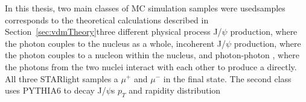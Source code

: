     In this thesis, two main classes of MC simulation samples were used\DIFdelbegin {}\DIFdelend \DIFaddbegin {}\DIFaddend samples corresponds to the theoretical calculations 
      described in Section~\ref{sec:vdmTheory}\DIFdelbegin {}\DIFdelend \DIFaddbegin {}\DIFaddend three different physical process \DIFdelbegin {}\DIFdelend \DIFaddbegin {}\DIFaddend J/$\psi$ production, where the photon couples to the nucleus as
      a whole, incoherent J/$\psi$ production, where the photon couples to a
      nucleon within the nucleus, and \DIFdelbegin {}\DIFdelend photon-photon \DIFdelbegin {}\DIFdelend \DIFaddbegin {}\DIFaddend , where the 
      photons from the two nuclei interact with each other to produce a \DIFdelbegin {}\DIFdelend \DIFaddbegin {}\DIFaddend directly.
    All three STARlight samples \DIFdelbegin {}\DIFdelend \DIFaddbegin {}\DIFaddend a $\mu^{+}$ and $\mu^{-}$ in the final 
      state\DIFdelbegin {}\DIFdelend .
    The second class uses PYTHIA6 to decay J/$\psi$s \DIFdelbegin {}\DIFdelend \DIFaddbegin {}\DIFaddend $p_{T}$ and rapidity distribution \DIFdelbegin {}\DIFdelend \DIFaddbegin {}\DIFaddend 

